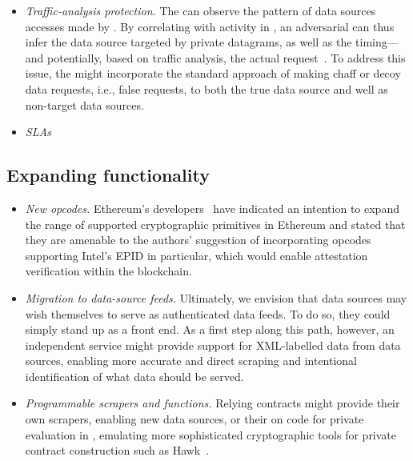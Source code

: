 \begin{itemize}
\item{\em Traffic-analysis protection.} The \medname can observe the pattern of data sources accesses made by \tc. By correlating with activity in \tcont, an adversarial \medname can thus infer the data source targeted by private datagrams, as well as the timing---and potentially, based on traffic analysis, the actual request~\cite{XiaoFeng}. To address this issue, the \encname might incorporate the standard approach of making chaff or decoy data requests, i.e., false requests, to both the true data source and well as non-target data sources.
\item{\em SLAs}
\end{itemize}

\subsection{Expanding \tc functionality}

\begin{itemize}
\item{\em New opcodes.} Ethereum's developers~\cite{Buterinpersonal} have indicated an intention to expand the range of supported cryptographic primitives in Ethereum and stated that they are amenable to the authors' suggestion of incorporating opcodes supporting Intel's EPID in particular, which would enable attestation verification within the blockchain. 
\item{\em Migration to data-source feeds.} Ultimately, we envision that data sources may wish themselves to serve as authenticated data feeds. To do so, they could simply stand up \tc as a front end. As a first step along this path, however, an independent \tc service might provide support for XML-labelled data from data sources, enabling more accurate and direct scraping and intentional identification of what data should be served.  
\item{\em Programmable scrapers and functions.} Relying contracts might provide their own scrapers, enabling new data sources, or their on code for private evaluation in \tc, emulating more sophisticated cryptographic tools for private contract construction such as Hawk~\cite{}. 
\end{itemize}


